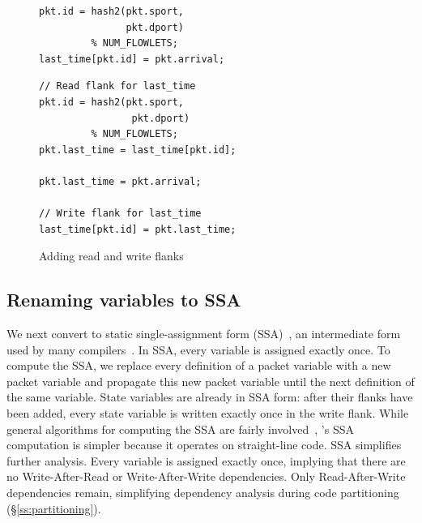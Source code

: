 \begin{figure}[!t]
  \begin{minipage}{0.47\textwidth}
  \begin{small}
  \begin{lstlisting}[style=customc]
pkt.id = hash2(pkt.sport,
               pkt.dport)
         % NUM_FLOWLETS;
last_time[pkt.id] = pkt.arrival;
  \end{lstlisting}
  \end{small}
  \end{minipage}
  \begin{minipage}{0.53\textwidth}
  \begin{small}
  \begin{lstlisting}[style=customc]
// Read flank for last_time
pkt.id = hash2(pkt.sport,
                pkt.dport)
         % NUM_FLOWLETS;
pkt.last_time = last_time[pkt.id];

pkt.last_time = pkt.arrival;

// Write flank for last_time
last_time[pkt.id] = pkt.last_time;
  \end{lstlisting}
  \end{small}
  \end{minipage}
  \caption{Adding read and write flanks}
\label{fig:stateful_flanks}
\end{figure}

\subsection{Renaming variables to SSA}
\label{ss:ssa}

We next convert to static single-assignment form (SSA)~\cite{ssa}, an
intermediate form used by many compilers~\cite{tree_ssa, llvm}.  In SSA, every
variable is assigned exactly once. To compute the SSA, we replace every
definition of a packet variable with a new packet variable and propagate this
new packet variable until the next definition of the same variable. State
variables are already in SSA form: after their flanks have been added, every
state variable is written exactly once in the write flank.  While general
algorithms for computing the SSA are fairly involved~\cite{ssa}, \pktlanguage's
SSA computation is simpler because it operates on straight-line code.  SSA
simplifies further analysis. Every variable is assigned exactly once, implying
that there are no Write-After-Read or Write-After-Write dependencies. Only
Read-After-Write dependencies remain, simplifying dependency
analysis during code partitioning (\S\ref{ss:partitioning}).

